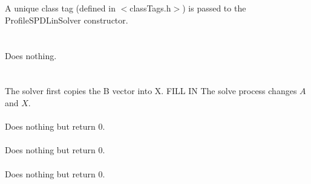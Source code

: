   \\
  \\
A unique class tag (defined in $<$classTags.h$>$) is passed to the
ProfileSPDLinSolver constructor. \\


 \\
\\ 
Does nothing. \\

  \\
 \\
The solver first copies the B vector into X.
FILL IN
The solve process changes $A$ and $X$. \\   


 \\
Does nothing but return $0$. \\

 \\ 
Does nothing but return $0$. \\

 \\ 
Does nothing but return $0$. \\







